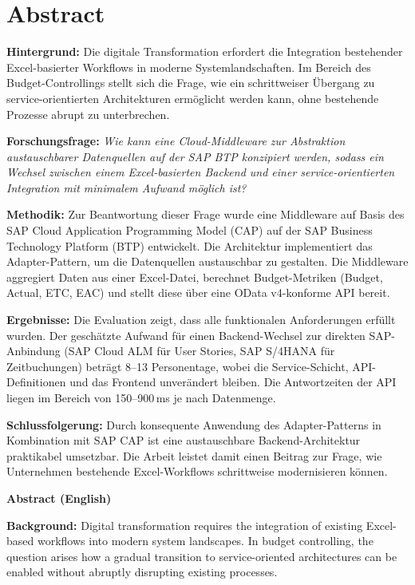 \section*{Abstract}

\textbf{Hintergrund:} Die digitale Transformation erfordert die Integration bestehender Excel-basierter Workflows in moderne Systemlandschaften. Im Bereich des Budget-Controllings stellt sich die Frage, wie ein schrittweiser Übergang zu service-orientierten Architekturen ermöglicht werden kann, ohne bestehende Prozesse abrupt zu unterbrechen.

\textbf{Forschungsfrage:} \textit{Wie kann eine Cloud-Middleware zur Abstraktion austauschbarer Datenquellen auf der SAP BTP konzipiert werden, sodass ein Wechsel zwischen einem Excel-basierten Backend und einer service-orientierten Integration mit minimalem Aufwand möglich ist?}

\textbf{Methodik:} Zur Beantwortung dieser Frage wurde eine Middleware auf Basis des SAP Cloud Application Programming Model (CAP) auf der SAP Business Technology Platform (BTP) entwickelt. Die Architektur implementiert das Adapter-Pattern, um die Datenquellen austauschbar zu gestalten. Die Middleware aggregiert Daten aus einer Excel-Datei, berechnet Budget-Metriken (Budget, Actual, ETC, EAC) und stellt diese über eine OData v4-konforme API bereit.

\textbf{Ergebnisse:} Die Evaluation zeigt, dass alle funktionalen Anforderungen erfüllt wurden. Der geschätzte Aufwand für einen Backend-Wechsel zur direkten SAP-Anbindung (SAP Cloud ALM für User Stories, SAP S/4HANA für Zeitbuchungen) beträgt 8--13 Personentage, wobei die Service-Schicht, API-Definitionen und das Frontend unverändert bleiben. Die Antwortzeiten der API liegen im Bereich von 150--900\,ms je nach Datenmenge.

\textbf{Schlussfolgerung:} Durch konsequente Anwendung des Adapter-Patterns in Kombination mit SAP CAP ist eine austauschbare Backend-Architektur praktikabel umsetzbar. Die Arbeit leistet damit einen Beitrag zur Frage, wie Unternehmen bestehende Excel-Workflows schrittweise modernisieren können.

\bigskip
\large{\textbf{Abstract (English)}}

\normalsize
\textbf{Background:} Digital transformation requires the integration of existing Excel-based workflows into modern system landscapes. In budget controlling, the question arises how a gradual transition to service-oriented architectures can be enabled without abruptly disrupting existing processes.

